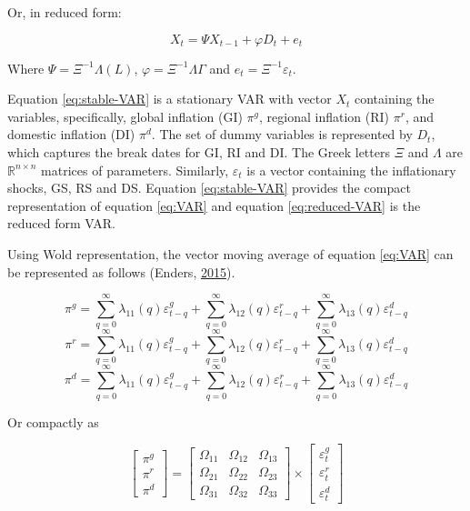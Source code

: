 \documentclass[]{article}
\begin{document}
Or, in reduced form:

\begin{equation}
X_{t}=\Psi X_{t-1}+\varphi D_{t}+e_{t} \label{eq:reduced-VAR}
\end{equation}

Where \(\Psi=\Xi^{-1} \Lambda (L)\), \(\varphi=\Xi^{-1} \Lambda \Gamma\) and \(e_t=\Xi^{-1} \varepsilon_{t}\).

Equation \eqref{eq:stable-VAR} is a stationary VAR with vector \(X_t\) containing the variables, specifically, global inflation (GI) \(π^g\), regional inflation (RI) \(π^r\), and domestic inflation (DI) \(π^d\). The set of dummy variables is represented by \(D_t\), which captures the break dates for GI, RI and DI. The Greek letters \(\Xi\) and \(\Lambda\) are \(\mathbb{R}^{n×n}\) matrices of parameters. Similarly, \(\varepsilon_t\) is a vector containing the inflationary shocks, GS, RS and DS. Equation \eqref{eq:stable-VAR} provides the compact representation of equation \eqref{eq:VAR} and equation \eqref{eq:reduced-VAR} is the reduced form VAR.

Using Wold representation, the vector moving average of equation \eqref{eq:VAR} can be represented as follows (Enders, \protect\hyperlink{ref-enders2015applied}{2015}).

\begin{equation}
\pi^{g}=\sum_{q=0}^{\infty}\lambda_{11}(q) \varepsilon^{g}_{t-q}+\sum_{q=0}^{\infty}\lambda_{12}(q) \varepsilon^{r}_{t-q}+\sum_{q=0}^{\infty}\lambda_{13}(q) \varepsilon^{d}_{t-q} \label{eq:G-SVAR}
\end{equation}
\begin{equation}
\pi^{r}=\sum_{q=0}^{\infty}\lambda_{11}(q) \varepsilon^{g}_{t-q}+\sum_{q=0}^{\infty}\lambda_{12}(q) \varepsilon^{r}_{t-q}+\sum_{q=0}^{\infty}\lambda_{13}(q) \varepsilon^{d}_{t-q} \label{eq:R-SVAR}
\end{equation}
\begin{equation}
\pi^{d}=\sum_{q=0}^{\infty}\lambda_{11}(q) \varepsilon^{g}_{t-q}+\sum_{q=0}^{\infty}\lambda_{12}(q) \varepsilon^{r}_{t-q}+\sum_{q=0}^{\infty}\lambda_{13}(q) \varepsilon^{d}_{t-q} \label{eq:D-SVAR}
\end{equation}

Or compactly as

\begin{equation}
\begin{bmatrix}
\pi^{g}\\
\pi^{r}\\
\pi^{d}
\end{bmatrix}=
\begin{bmatrix}
\Omega_{11} & \Omega_{12} & \Omega_{13}\\
\Omega_{21} & \Omega_{22} & \Omega_{23}\\
\Omega_{31} & \Omega_{32} & \Omega_{33} 
\end{bmatrix} \times 
\begin{bmatrix}
\varepsilon^{g}_t\\
\varepsilon^{r}_t\\
\varepsilon^{d}_t
\end{bmatrix} 
\label{eq:BMA}
\end{equation}
\end{document}
